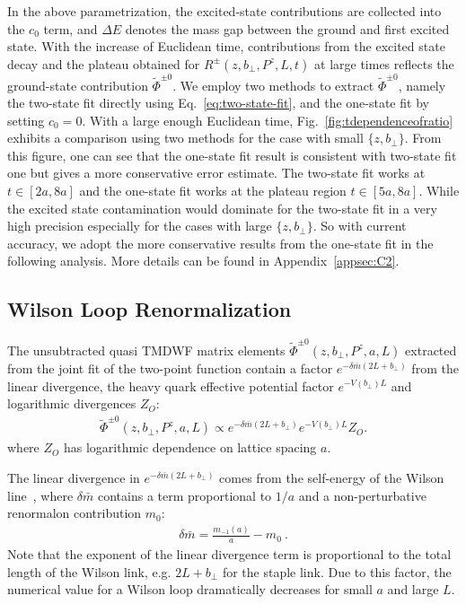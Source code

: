  
In the above parametrization,  the excited-state contributions are collected into the $c_0$ term, and $\Delta E$ denotes the mass gap between the ground and first excited state.  With the increase of Euclidean time, contributions from the excited state decay and the plateau obtained for $R^{\pm}\left(z,b_{\perp},P^z,L,t \right)$ at large times reflects the ground-state contribution $\tilde{\Phi}^{\pm0}$. We employ two methods to extract $\tilde{\Phi}^{\pm0}$, namely the two-state fit directly using Eq.~\eqref{eq:two-state-fit}, and the one-state fit by setting $c_0=0$. With a large enough Euclidean time, Fig.~\ref{fig:tdependenceofratio} exhibits a comparison using two methods for the case with small $\{z,b_{\perp}\}$. From this figure, one can see that the one-state fit result is consistent with two-state fit one but gives  a more conservative error estimate. The two-state fit works at $t\in[2a, 8a]$ and the one-state fit works at the plateau region $t\in[5a, 8a]$. While the excited state contamination would dominate for the two-state fit in a very high precision especially for the cases with large $\{z, b_\perp\}$. So with current accuracy, we adopt the more conservative results from the one-state fit in the following analysis. More details can be found in Appendix~\ref{appsec:C2}.



\subsection{Wilson Loop Renormalization}
\label{subsec:numerical_wl}

The unsubtracted quasi TMDWF matrix elements $\tilde{\Phi}^{\pm0}\left(z,b_{\perp},P^z,a,L\right)$ extracted from the joint fit of the  two-point function contain a factor $e^{-\delta \bar{m}(2L+b_{\perp})}$ from the linear divergence, the heavy quark effective potential factor $e^{-V(b_{\perp})L}$ and logarithmic divergences $Z_{O}$:
\begin{align}
\tilde{\Phi}^{\pm0}\left(z,b_{\perp},P^z,a,L\right) \propto e^{-\delta \bar{m}(2L+b_{\perp})}e^{-V(b_{\perp})L}Z_{O}.
\end{align} 
where $Z_O$ has logarithmic dependence on lattice spacing $a$. 

The linear divergence in $e^{-\delta \bar{m}(2L+b_{\perp})}$ comes from the self-energy of the Wilson line~\cite{Ji:2017oey,Ishikawa:2017faj,Green:2017xeu, Ji:2020brr}, where $\delta\bar m$ contains a term  proportional to $1/a$  and a  non-perturbative renormalon contribution $m_{0}$:
\begin{align}
\delta\bar m = \frac{m_{-1}(a)}{a} - m_0  \ . 
\end{align}
Note that the exponent of the linear divergence term is proportional to the total length of the Wilson link, e.g. $2L+b_{\perp}$ for the staple link. Due to this factor,  the numerical value for a Wilson loop dramatically decreases  for small $a$ and large $L$. 

